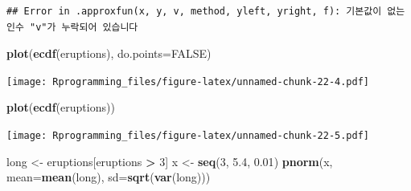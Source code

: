 \documentclass[11pt,]{krantz}
\makeatletter
\newenvironment{Shaded}{\begin{snugshade}}{\end{snugshade}}
\newcommand{\KeywordTok}[1]{\textcolor[rgb]{0.13,0.29,0.53}{\textbf{#1}}}
\newcommand{\DataTypeTok}[1]{\textcolor[rgb]{0.13,0.29,0.53}{#1}}
\newcommand{\DecValTok}[1]{\textcolor[rgb]{0.00,0.00,0.81}{#1}}
\newcommand{\FloatTok}[1]{\textcolor[rgb]{0.00,0.00,0.81}{#1}}
\newcommand{\StringTok}[1]{\textcolor[rgb]{0.31,0.60,0.02}{#1}}
\newcommand{\OtherTok}[1]{\textcolor[rgb]{0.56,0.35,0.01}{#1}}
\newcommand{\OperatorTok}[1]{\textcolor[rgb]{0.81,0.36,0.00}{\textbf{#1}}}
\newcommand{\NormalTok}[1]{#1}
\newenvironment{kframe}{%
\medskip{}
\setlength{\fboxsep}{.8em}
 \def\at@end@of@kframe{}%
 \ifinner\ifhmode%
  \def\at@end@of@kframe{\end{minipage}}%
  \begin{minipage}{\columnwidth}%
 \fi\fi%
 \def\FrameCommand##1{\hskip\@totalleftmargin \hskip-\fboxsep
 \colorbox{shadecolor}{##1}\hskip-\fboxsep
     \hskip-\linewidth \hskip-\@totalleftmargin \hskip\columnwidth}%
 \MakeFramed {\advance\hsize-\width
   \@totalleftmargin\z@ \linewidth\hsize
   \@setminipage}}%
 {\par\unskip\endMakeFramed%
 \at@end@of@kframe}
\renewenvironment{Shaded}{\begin{kframe}}{\end{kframe}}
\theoremstyle{definition}
\theoremstyle{definition}
\theoremstyle{remark}
\makeatother
\begin{document}
\begin{verbatim}
## Error in .approxfun(x, y, v, method, yleft, yright, f): 기본값이 없는 인수 "v"가 누락되어 있습니다
\end{verbatim}

\begin{Shaded}
\begin{Highlighting}[]
\KeywordTok{plot}\NormalTok{(}\KeywordTok{ecdf}\NormalTok{(eruptions), }\DataTypeTok{do.points=}\OtherTok{FALSE}\NormalTok{)}
\end{Highlighting}
\end{Shaded}

\texttt{[image: Rprogramming\_files/figure-latex/unnamed-chunk-22-4.pdf]}

\begin{Shaded}
\begin{Highlighting}[]
\KeywordTok{plot}\NormalTok{(}\KeywordTok{ecdf}\NormalTok{(eruptions))}
\end{Highlighting}
\end{Shaded}

\texttt{[image: Rprogramming\_files/figure-latex/unnamed-chunk-22-5.pdf]}

\begin{Shaded}
\begin{Highlighting}[]
\NormalTok{long <-}\StringTok{ }\NormalTok{eruptions[eruptions }\OperatorTok{>}\StringTok{ }\DecValTok{3}\NormalTok{]}
\NormalTok{x <-}\StringTok{ }\KeywordTok{seq}\NormalTok{(}\DecValTok{3}\NormalTok{, }\FloatTok{5.4}\NormalTok{, }\FloatTok{0.01}\NormalTok{)}
\KeywordTok{pnorm}\NormalTok{(x, }\DataTypeTok{mean=}\KeywordTok{mean}\NormalTok{(long), }\DataTypeTok{sd=}\KeywordTok{sqrt}\NormalTok{(}\KeywordTok{var}\NormalTok{(long)))}
\end{Highlighting}
\end{Shaded}
\end{document}
